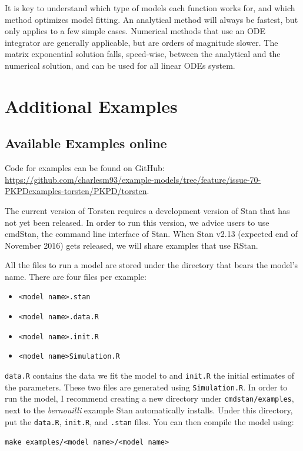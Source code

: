 \documentclass[11pt]{amsart}
\let\oldsection\section
\renewcommand\section{\clearpage\oldsection}
\begin{document}
It is key to understand which type of models each function works for, and which method optimizes model fitting. An analytical method will always be fastest, but only applies to a few simple cases. Numerical methods that use an ODE integrator are generally applicable, but are orders of magnitude slower. The matrix exponential solution falls, speed-wise, between the analytical and the numerical solution, and can be used for all linear ODEs system. 


\section{Additional Examples}

\subsection*{Available Examples online} Code for examples can be found on GitHub: \url{https://github.com/charlesm93/example-models/tree/feature/issue-70-PKPDexamples-torsten/PKPD/torsten}.

The current version of Torsten requires a development version of Stan that has not yet been released. In order to run this version, we advice users to use cmdStan, the command line interface of Stan. When Stan v2.13 (expected end of November 2016) gets released, we will share examples that use RStan.

All the files to run a model are stored under the directory that bears the model's name. There are four files per example:
\begin{itemize}
  \item \texttt{<model name>.stan}
  \item \texttt{<model name>.data.R}
  \item \texttt{<model name>.init.R}
  \item \texttt{<model name>Simulation.R}
\end{itemize}

\texttt{data.R} contains the data we fit the model to and \texttt{init.R} the initial estimates of the parameters. These two files are generated using \texttt{Simulation.R}. In order to run the model, I recommend creating a new directory under \texttt{cmdstan/examples}, next to the \textit{bernouilli} example Stan automatically installs. Under this directory, put the \texttt{data.R}, \texttt{init.R}, and \texttt{.stan} files. You can then compile the model using:

\texttt{make examples/<model name>/<model name>}
\end{document}

